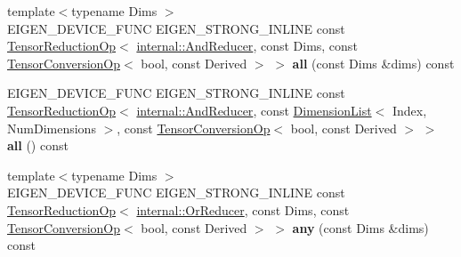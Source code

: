 \begin{DoxyCompactItemize}
\item 
\mbox{\label{class_eigen_1_1_tensor_base_3_01_derived_00_01_read_only_accessors_01_4_a024a8ff93253c862afcc1e6e043dd06c}} 
{\footnotesize template$<$typename Dims $>$ }\\E\+I\+G\+E\+N\+\_\+\+D\+E\+V\+I\+C\+E\+\_\+\+F\+U\+NC E\+I\+G\+E\+N\+\_\+\+S\+T\+R\+O\+N\+G\+\_\+\+I\+N\+L\+I\+NE const \hyperlink{class_eigen_1_1_tensor_reduction_op}{Tensor\+Reduction\+Op}$<$ \hyperlink{struct_eigen_1_1internal_1_1_and_reducer}{internal\+::\+And\+Reducer}, const Dims, const \hyperlink{class_eigen_1_1_tensor_conversion_op}{Tensor\+Conversion\+Op}$<$ bool, const Derived $>$ $>$ {\bfseries all} (const Dims \&dims) const
\item 
\mbox{\label{class_eigen_1_1_tensor_base_3_01_derived_00_01_read_only_accessors_01_4_ab869f673dcd8426a0d9d9226ffa5eec2}} 
E\+I\+G\+E\+N\+\_\+\+D\+E\+V\+I\+C\+E\+\_\+\+F\+U\+NC E\+I\+G\+E\+N\+\_\+\+S\+T\+R\+O\+N\+G\+\_\+\+I\+N\+L\+I\+NE const \hyperlink{class_eigen_1_1_tensor_reduction_op}{Tensor\+Reduction\+Op}$<$ \hyperlink{struct_eigen_1_1internal_1_1_and_reducer}{internal\+::\+And\+Reducer}, const \hyperlink{struct_eigen_1_1_dimension_list}{Dimension\+List}$<$ Index, Num\+Dimensions $>$, const \hyperlink{class_eigen_1_1_tensor_conversion_op}{Tensor\+Conversion\+Op}$<$ bool, const Derived $>$ $>$ {\bfseries all} () const
\item 
\mbox{\label{class_eigen_1_1_tensor_base_3_01_derived_00_01_read_only_accessors_01_4_a511ebf4cc5cbf9084b0f4e2e8aa74912}} 
{\footnotesize template$<$typename Dims $>$ }\\E\+I\+G\+E\+N\+\_\+\+D\+E\+V\+I\+C\+E\+\_\+\+F\+U\+NC E\+I\+G\+E\+N\+\_\+\+S\+T\+R\+O\+N\+G\+\_\+\+I\+N\+L\+I\+NE const \hyperlink{class_eigen_1_1_tensor_reduction_op}{Tensor\+Reduction\+Op}$<$ \hyperlink{struct_eigen_1_1internal_1_1_or_reducer}{internal\+::\+Or\+Reducer}, const Dims, const \hyperlink{class_eigen_1_1_tensor_conversion_op}{Tensor\+Conversion\+Op}$<$ bool, const Derived $>$ $>$ {\bfseries any} (const Dims \&dims) const
\item 
\mbox{\label{class_eigen_1_1_tensor_base_3_01_derived_00_01_read_only_accessors_01_4_a1cfc7d65ad87e07910e17c4b4eabf3df}} 

\end{DoxyCompactItemize}
